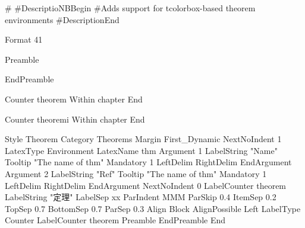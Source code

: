 #
#DescriptioNBBegin
#Adds support for tcolorbox-based theorem environments
#DescriptionEnd

Format 41

Preamble
\usepackage{ctex}
\usepackage[most]{tcolorbox}
\usepackage{fontspec}
\usepackage{multicol}

\usepackage{ifthen}

\usepackage{xcolor}

\usepackage{chngcntr}
\usepackage{stackengine}

\usepackage{tasks}
\newlength{\longestlabel}
\settowidth{\longestlabel}{\bfseries viii.}

\usepackage[lastexercise,answerdelayed]{exercise}
\newcommand{\QuestionNBB}{\bfseries\arabic{Question}.\ }
\renewcommand{\ExerciseName}{练习题}
\renewcommand{\ExerciseHeader}{\noindent\def\stackalignment{l}%
    \stackunder[0pt]{\colorbox{cyan}{\textcolor{white}{\textbf{\large\ExerciseName\;\LARGE\ExerciseHeaderNB}}}}{\textcolor{lightcyan}{\rule{\linewidth}{2pt}}}\medskip}
\renewcommand{\AnswerName}{Exercises}
\renewcommand{\AnswerHeader}{\ifthenelse{\boolean{firstanswerofthechapter}}%
    {\bigskip\noindent\textcolor{cyan}{\textbf{CHAPTER \thesection}}\newline\newline%
        \noindent\bfseries\emph{\textcolor{cyan}{\AnswerName\ \ExerciseHeaderNB}}\smallskip}
    {\noindent\bfseries\emph{\textcolor{cyan}{\AnswerName\ \ExerciseHeaderNB}}\smallskip}}
\setlength{\QuestionIndent}{16pt}
EndPreamble

Counter theorem
	Within         chapter
End

Counter theoremi
	Within         chapter
End

Style Theorem
    Category              Theorems
    Margin                First_Dynamic
	NextNoIndent          1    
	LatexType             Environment
    LatexName             thm
    Argument 1
    	LabelString    "Name"
    	Tooltip        "The name of thm"
    	Mandatory      1
    	LeftDelim      {
    	RightDelim     }
    EndArgument
    Argument 2
    	LabelString    "Ref"
    	Tooltip        "The name of thm"
    	Mandatory      1
    	LeftDelim      {
    	RightDelim     }
    EndArgument
    NextNoIndent          0
    LabelCounter          theorem
    LabelString           "定理\thetheorem"
    LabelSep              xx
	ParIndent             MMM
	ParSkip               0.4
	ItemSep               0.2
	TopSep                0.7
	BottomSep             0.7
	ParSep                0.3
	Align                 Block
	AlignPossible         Left
	LabelType             Counter
	LabelCounter          theorem
    Preamble
    EndPreamble
    End
    
